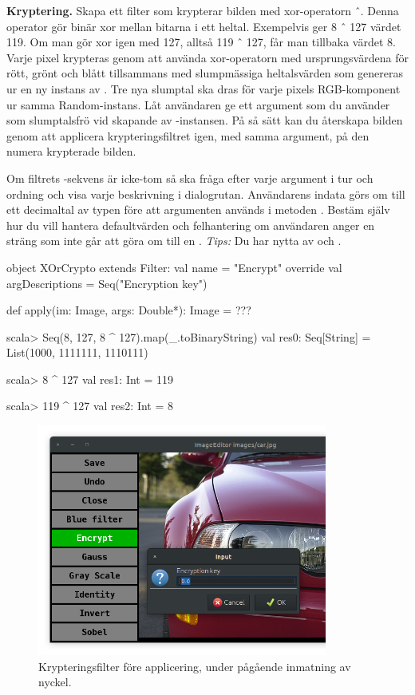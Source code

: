 \Task \textbf{Kryptering.} Skapa ett filter  som krypterar bilden med xor-operatorn ˆ. Denna operator gör binär xor mellan bitarna i ett heltal. Exempelvis ger 8 ˆ 127 värdet 119. Om man gör xor igen med 127, alltså 119 ˆ 127, får man tillbaka värdet 8. Varje pixel krypteras genom att använda xor-operatorn med ursprungsvärdena för rött, grönt och blått tillsammans med slumpmässiga heltalsvärden som genereras ur en ny instans av . Tre nya slumptal ska dras för varje pixels RGB-komponent ur samma Random-instans. Låt användaren ge ett argument som du använder som slumptalsfrö vid skapande av -instansen. På så sätt kan du återskapa bilden genom att applicera krypteringsfiltret igen, med samma argument, på den numera krypterade bilden.

Om filtrets -sekvens är icke-tom så ska  fråga efter varje argument i tur och ordning och visa varje beskrivning i dialogrutan. Användarens indata görs om till ett decimaltal av typen  före att argumenten används i metoden . Bestäm själv hur du vill hantera defaultvärden och felhantering om användaren anger en sträng som inte går att göra om till en . \emph{Tips:} Du har nytta av  och .

\begin{CodeSmall}
  object XOrCrypto extends Filter:
    val name = "Encrypt"
    override val argDescriptions = Seq("Encryption key")

    def apply(im: Image, args: Double*): Image = ???
\end{CodeSmall}

\begin{REPLnonum}
scala> Seq(8, 127, 8 ^ 127).map(_.toBinaryString)
val res0: Seq[String] = List(1000, 1111111, 1110111)

scala> 8 ^ 127
val res1: Int = 119

scala> 119 ^ 127
val res2: Int = 8
\end{REPLnonum}

\begin{figure}
\centering
\includegraphics[width=0.85\textwidth]{../img/w12-assignment-photo/photo-xor.png}
\caption{Krypteringsfilter före applicering, under pågående inmatning av nyckel. }
\label{photo:fig:photo-xor}
\end{figure}
  

